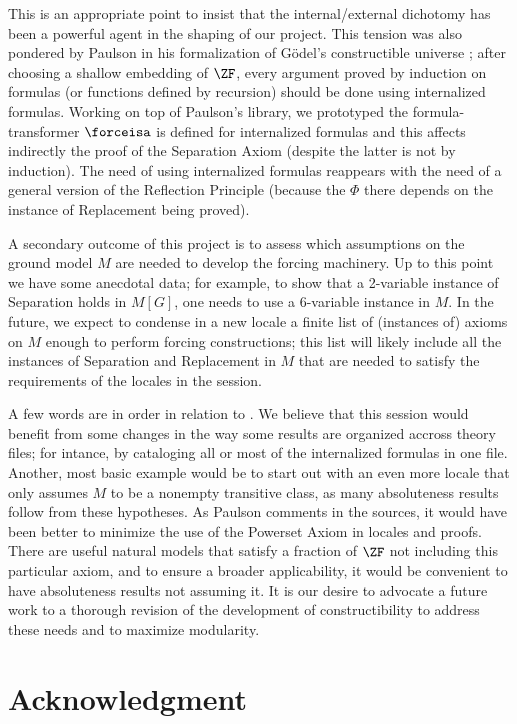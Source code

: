 This is an appropriate point to insist that the internal/external
dichotomy has been a powerful agent in the shaping of our project.
This tension was also pondered by Paulson in his formalization of
Gödel's constructible universe \cite{MR2051585}; after choosing a
shallow embedding of $\ZF$, every argument proved by induction on
formulas (or functions defined by recursion) should be done using
internalized formulas. Working on top of Paulson's library, we
prototyped the formula-transformer $\forceisa$ is defined for
internalized formulas and this affects indirectly the proof of the
Separation Axiom (despite the latter is not by induction). The need of
using internalized formulas reappears with the need of a general
version of the Reflection Principle (because the $\Phi$ there depends
on the instance of Replacement being proved).

A secondary outcome of this project is to assess which assumptions on
the ground model $M$ are needed to develop the forcing machinery. Up
to this point we have some anecdotal data; for example, to show that a
2-variable instance of Separation holds in $M[G]$, one needs to use a
6-variable instance in $M$. In the future, we expect to condense in a
new locale a finite list of (instances of) axioms on $M$ enough to
perform forcing constructions; this list will likely include all the
instances of Separation and Replacement in $M$ that are needed to
satisfy the requirements of the locales in the
 session.

A few words are in order in relation to .
We believe that this  session  would benefit from some changes in
the way some results are organized accross theory files; for
intance, by cataloging all or most of the internalized formulas in one
file. Another, most basic example would be to start out with an even
more locale that only assumes $M$ to be a nonempty transitive class,
as many absoluteness results follow from these hypotheses.
As Paulson comments in the sources, it would have been better to
minimize the use of the Powerset Axiom in locales and proofs. There
are  useful natural models that satisfy a fraction of $\ZF$ not including
this particular axiom, and to ensure a broader applicability, it would
be convenient to have  absoluteness results not assuming it.
It is our desire to advocate a future work to a thorough
revision of the development of constructibility to address these needs
and to maximize modularity.


\section*{Acknowledgment}


